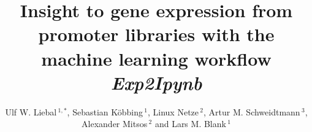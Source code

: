 \documentclass[utf8]{frontiersSCNS} %
\def\firstAuthorLast{Liebal {et~al.}} %
\def\Authors{Ulf W. Liebal\,$^{1,*}$, Sebastian Köbbing\,$^{1}$, Linux Netze\,$^{2}$, Artur M. Schweidtmann\,$^{3}$, Alexander Mitsos\,$^{2}$ and Lars M. Blank\,$^{1}$}
\begin{document}
\onecolumn
{}

\title[Machine learning with promoter libraries]{Insight to gene expression from promoter libraries with the machine learning workflow \textit{Exp2Ipynb}}

\author[\firstAuthorLast ]{\Authors} %
\address{} %
\correspondance{} %

\extraAuth{}%


\maketitle
\end{document}
